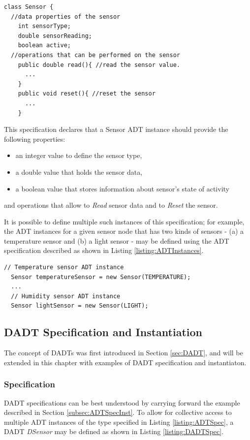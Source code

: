 \begin{lstlisting}[frame=trbl, basewidth={0.55em, 0.6em}, captionpos=b,
basicstyle=\ttfamily\footnotesize, breaklines, caption = Sensor ADT instances, label =
listing:ADTSpec]
class Sensor {
  //data properties of the sensor 
    int sensorType;
    double sensorReading;
    boolean active; 
  //operations that can be performed on the sensor  
    public double read(){ //read the sensor value.
	  ...
	} 
	public void reset(){ //reset the sensor
	  ...
	}    
\end{lstlisting}

This specification declares that a Sensor ADT instance should provide the following properties:
\begin{itemize}
\item an integer value to define the sensor type,
\item a double value that holds the sensor data, 
\item a boolean value that stores information about sensor's state of activity
\end{itemize}
and operations that allow to \emph{Read} sensor data and to \emph{Reset}
the sensor.

It is possible to define multiple such instances of this
specification; for example, the ADT instances for a given sensor node that has two kinds of sensors - (a) a
temperature sensor and (b) a light sensor - may be defined using the ADT
specification described as shown in Listing
\ref{listing:ADTInstances}. 
\begin{lstlisting}[frame=trbl, basewidth={0.55em, 0.6em}, captionpos=b,
basicstyle=\ttfamily\footnotesize, breaklines, caption = Sensor ADT instances, label =
listing:ADTInstances]
  // Temperature sensor ADT instance
  Sensor temperatureSensor = new Sensor(TEMPERATURE);
  ...
  // Humidity sensor ADT instance  
  Sensor lightSensor = new Sensor(LIGHT);
\end{lstlisting}

\subsection{DADT Specification and Instantiation} \label{subsubsec:dadtspecandinst}

The concept of DADTs was first introduced in Section \ref{sec:DADT}, and will
be extended in this chapter with examples of DADT specification and
instantiaton.

\subsubsection{Specification}
DADT specifications can be best understood by carrying forward the example
described in Section \ref{subsec:ADTSpecInst}. To allow for collective access
to multiple ADT instances of the type specified in Listing
\ref{listing:ADTSpec}, a DADT \emph{DSensor} may be defined as shown in Listing
\ref{listing:DADTSpec}.   
 
